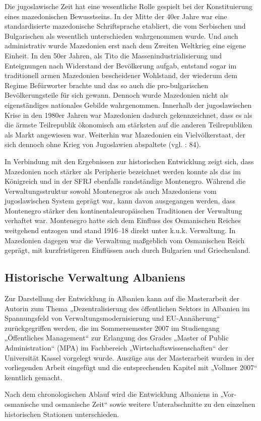 Die jugoslawische Zeit hat eine wesentliche Rolle gespielt bei der Konstituierung eines mazedonischen Bewusstseins. In der Mitte der 40er Jahre war eine standardisierte mazedonische Schriftsprache etabliert, die vom Serbischen und Bulgarischen als wesentlich unterschieden wahrgenommen wurde. Und auch administrativ wurde Mazedonien erst nach dem Zweiten Weltkrieg eine eigene Einheit. In den 50er Jahren, als Tito die Massenindustrialisierung und Enteignungen nach Widerstand der Bevölkerung aufgab, entstand sogar im traditionell armen Mazedonien bescheidener Wohlstand, der wiederum dem Regime Befürworter brachte und das so auch die pro-bulgarischen Bevölkerungsteile für sich gewann. Dennoch wurde Mazedonien nicht als eigenständiges nationales Gebilde wahrgenommen. Innerhalb der jugoslawischen Krise in den 1980er Jahren war Mazedonien dadurch gekennzeichnet, dass es als die ärmste Teilrepublik ökonomisch am stärksten auf die anderen Teilrepubliken als Markt angewiesen war. Weiterhin war Mazedonien ein Vielvölkerstaat, der sich dennoch ohne Krieg von Jugoslawien abspaltete (vgl. \cite{dobr} : 84).\par
In Verbindung mit den Ergebnissen zur historischen Entwicklung zeigt sich, dass Mazedonien noch stärker als Peripherie bezeichnet werden konnte als das im Königreich und in der SFRJ ebenfalls randständige Montenegro. Während die Verwaltungsstruktur sowohl Montenegros als auch Mazedoniens vom jugoslawischen System geprägt war, kann davon ausgegangen werden, dass Montenegro stärker den kontinentaleuropäischen Traditionen der Verwaltung verhaftet war. Montenegro hatte sich dem Einfluss des Osmanischen Reiches weitgehend entzogen und stand 1916–18 direkt unter k.u.k. Verwaltung. In Mazedonien dagegen war die Verwaltung maßgeblich vom Osmanischen Reich geprägt, mit kurzfristigeren Einflüssen auch durch Bulgarien und Griechenland.
\subsection{Historische Verwaltung Albaniens }
Zur Darstellung der Entwicklung in Albanien kann auf die Masterarbeit der Autorin zum Thema „Dezentralisierung des öffentlichen Sektors in Albanien im Spannungsfeld von Verwaltungsmodernisierung und EU-Annäherung“ zurückgegriffen werden, die im Sommersemester 2007 im Studiengang „Öffentliches Management“ zur Erlangung des Grades „Master of Public Administration“ (MPA) im Fachbereich „Wirtschaftswissenschaften“ der Universität Kassel vorgelegt wurde. Auszüge aus der Masterarbeit wurden in der vorliegenden Arbeit eingefügt und die entsprechenden Kapitel mit „Vollmer 2007“ kenntlich gemacht.\par
Nach dem chronologischen Ablauf wird die Entwicklung Albaniens in „Vor-osmanische und osmanische Zeit“ sowie weitere Unterabschnitte zu den einzelnen historischen Stationen unterschieden.
